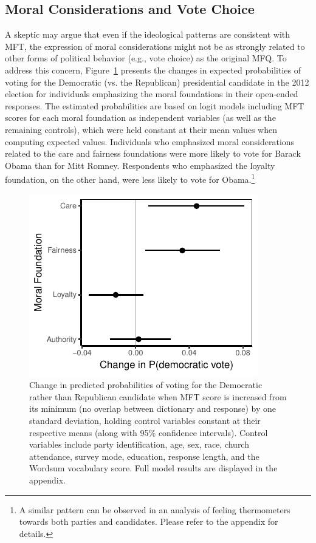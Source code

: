 \documentclass[12pt]{article}
\begin{document}
\subsection*{Moral Considerations and Vote Choice}

A skeptic may argue that even if the ideological patterns are consistent with MFT, the expression of moral considerations might not be as strongly related to other forms of political behavior (e.g., vote choice) as the original MFQ. To address this concern, Figure~\ref{fig:logit_vote} presents the changes in expected probabilities of voting for the Democratic (vs. the Republican) presidential candidate in the 2012 election for individuals emphasizing the moral foundations in their open-ended responses. The estimated probabilities are based on logit models including MFT scores for each moral foundation as independent variables (as well as  the remaining controls), which were held constant at their mean values when computing expected values. Individuals who emphasized moral considerations related to the care and fairness foundations were more likely to vote for Barack Obama than for Mitt Romney. Respondents who emphasized the loyalty foundation, on the other hand, were less likely to vote for Obama.\footnote{A similar pattern can be observed in an analysis of feeling thermometers towards both parties and candidates. Please refer to the appendix for details.}

\begin{figure}[ht]\centering
\includegraphics[scale=.9]{../calc/fig/logit_vote.pdf}
\caption{Change in predicted probabilities of voting for the Democratic rather than Republican candidate when MFT score is increased from its minimum (no overlap between dictionary and response) by one standard deviation, holding control variables constant at their respective means (along with 95\% confidence intervals). Control variables include party identification, age, sex, race, church attendance, survey mode, education, response length, and the Wordsum vocabulary score. Full model results are displayed in the appendix.
}\label{fig:logit_vote}
\end{figure}
\end{document}
